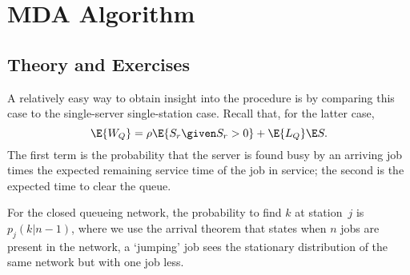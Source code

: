 
\section{MDA Algorithm}
\label{sec:mda}

\subsection*{Theory and Exercises}


A relatively easy way to obtain insight into the procedure is by
comparing this case to the single-server single-station case.  Recall that, for the latter case, 
\begin{equation*}
  \E{W_Q} = \rho \E{S_r\given S_r>0} + \E{L_Q} \E S.
\end{equation*}
The first term is the probability that the server is found busy by an
arriving job times the expected remaining service time of the job in
service; the second is the expected time to clear the queue. 

For the closed queueing network, the probability to find $k$ at
station~$j$ is $p_j(k|n-1)$, where we use the arrival theorem that
states when $n$ jobs are present in the network, a `jumping' job sees
the stationary distribution of the same network but with one job
less. 

